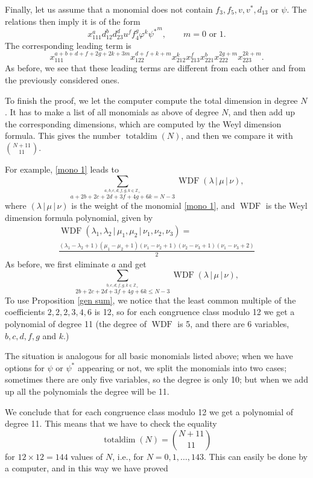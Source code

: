\documentclass[reqno,11pt]{amsart}
\theoremstyle{remark}
\theoremstyle{definition}
\numberwithin{equation}{section}
\newcommand{\bbar}{\,\big|\,}
\newcommand\la{{\lambda}}
\newcommand\WDF{\operatorname{WDF}}
\newcommand{\eq}{\begin{equation}}
\newcommand{\eeq}{\end{equation}}
\newcommand{\bbZ}{\mathbb{Z}}
\begin{document}
Finally, let us assume that a monomial does not contain $f_3,f_5,v,v^*,d_{13}$ or $\psi$. The relations then imply it is of the form
\eq\label{mono 7}
x_{111}^ad_{12}^bd_{23}^d u^f f_4^g  \varphi^k{\psi^*}^m,\qquad m=0\text{ or }1.
\eeq
The corresponding leading term is
\eq\label{LT 7}
x_{111}^{a+b+d+f+2g+2k+3m}x_{122}^{d+f+k+m}x_{212}^{k}x_{213}^{f}x_{221}^bx_{222}^{2g+m}x_{223}^{2k+m}.
\eeq
As before, we see that these leading terms are different from each other and from the previously considered ones.


To finish the proof, we let the computer compute the total dimension in degree $N$. It has to make a list of all monomials as above of degree $N$, and then add up the corresponding  dimensions, which are computed by the Weyl dimension formula. This gives the number $\operatorname{totaldim}(N)$, and then we compare it with $\binom{N+11}{11}$. 

For example, \eqref{mono 1} leads to
\[
\sum_{\overset{a,b,c,d,f,g,k\in\bbZ_+}{a+2b+2c+2d+3f+4g+6k=N-3}}\WDF(\la\bbar\mu\bbar\nu),
\]
where $(\la\bbar\mu\bbar\nu)$ is the weight of the monomial \eqref{mono 1}, 
and $\WDF$ is the Weyl dimension formula polynomial, given by
\begin{multline*}
\WDF(\la_1,\la_2\bbar\mu_1,\mu_2\bbar\nu_1,\nu_2,\nu_3)=\\ \frac{(\la_1-\la_2+1)(\mu_1-\mu_2+1)(\nu_1-\nu_2+1)(\nu_2-\nu_3+1)(\nu_1-\nu_3+2)}{2}
\end{multline*}
As before, we first eliminate $a$ and get
\[
\sum_{\overset{b,c,d,f,g,k\in\bbZ_+}{2b+2c+2d+3f+4g+6k\leq N-3}}\WDF(\la\bbar\mu\bbar\nu),
\]
To use Proposition \ref{gen sum}, we notice that the least common multiple of the coefficients $2,2,2,3,4,6$ is 12, so for each congruence class modulo 12 we get a polynomial of degree 11 (the degree of $\WDF$ is 5, and there are 6 variables, $b,c,d,f,g$ and $k$.)

The situation is analogous for all basic monomials listed above; when we have options for $\psi$ or $\psi^*$ appearing or not, we split the monomials into two cases; sometimes there are only five variables, so the degree is only 10; but when we add up all the polynomials the degree will be 11. 

We conclude that for each congruence class modulo 12 we get a polynomial of degree 11. This means that we have to check the equality
\[
\operatorname{totaldim}(N)=\binom{N+11}{11}
\]
for $12\times 12=144$ values of $N$, i.e., for $N=0,1,\dots,143$. This can easily be done by a computer, and in this way we have proved
\end{document}
